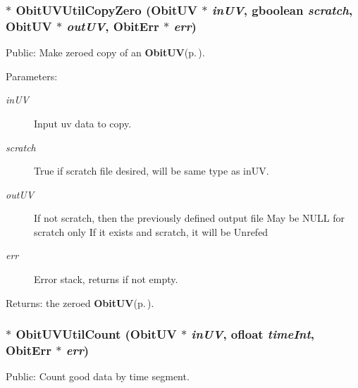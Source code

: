 \subsubsection{$\ast$ Obit\-UVUtil\-Copy\-Zero ({\bf Obit\-UV} $\ast$ {\em in\-UV}, gboolean {\em scratch}, {\bf Obit\-UV} $\ast$ {\em out\-UV}, {\bf Obit\-Err} $\ast$ {\em err})}\label{ObitUVUtil_8h_a1}


Public: Make zeroed copy of an {\bf Obit\-UV}{\rm (p.\,\pageref{structObitUV})}. 

\begin{Desc}
\item[Parameters:]
\begin{description}
\item[{\em in\-UV}]Input uv data to copy. \item[{\em scratch}]True if scratch file desired, will be same type as in\-UV. \item[{\em out\-UV}]If not scratch, then the previously defined output file May be NULL for scratch only If it exists and scratch, it will be Unrefed \item[{\em err}]Error stack, returns if not empty. \end{description}
\end{Desc}
\begin{Desc}
\item[Returns:]the zeroed {\bf Obit\-UV}{\rm (p.\,\pageref{structObitUV})}. \end{Desc}
\subsubsection{$\ast$ Obit\-UVUtil\-Count ({\bf Obit\-UV} $\ast$ {\em in\-UV}, {\bf ofloat} {\em time\-Int}, {\bf Obit\-Err} $\ast$ {\em err})}\label{ObitUVUtil_8h_a9}


Public: Count good data by time segment. 

